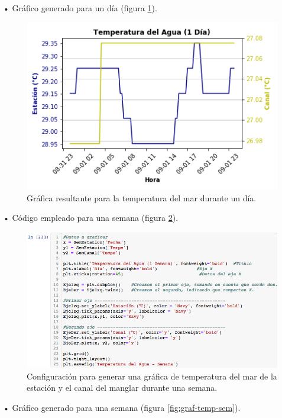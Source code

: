 \documentclass[12pt]{article}
\begin{document}
\noindent • Gráfico generado para un día (figura \ref{fig:graf-temp-dia}). \\

\begin{figure}[h!]
	\center
	\includegraphics[scale=.6]{Temperatura-del-Agua-Dia}
	\caption{\label{fig:graf-temp-dia} Gráfica resultante para la temperatura del mar durante un día.}
\end{figure}

\noindent • Código empleado para una semana (figura \ref{fig:cod-temp-sem}). \\

\begin{figure}[h!]
	\center
	\includegraphics[scale=.6]{./Images/temp-sem}
	\caption{\label{fig:cod-temp-sem} Configuración para generar una gráfica de temperatura del mar de la estación y el canal del manglar durante una semana.}
\end{figure}

\noindent • Gráfico generado para una semana (figura \ref{fig:graf-temp-sem}). \\
\end{document}
